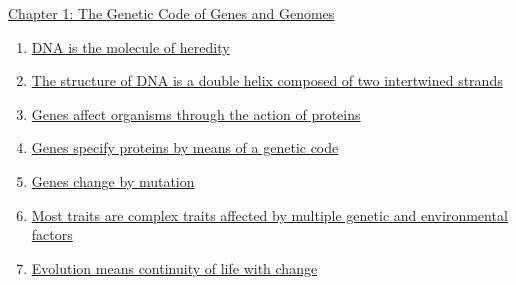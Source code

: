 \documentclass[12pt,letterpaper]{article}
\newcommand{\thetitle}{\hypertarget{home}{Essential Genetics and Genomics}}
\begin{document}



\clearpage

\renewcommand{\thetitle}{\hypertarget{1}{The Genetic Code of Genes
and Genomes}}
\hypertarget{1}{} 

\begin{chapbox}{\hyperlink{home}{Chapter 1: The Genetic Code of Genes
    and Genomes}}
    \begin{enumerate}
        \item \hyperlink{1.1}{DNA is the molecule of heredity}
        \item \hyperlink{1.2}{The structure of DNA is a double helix composed of two intertwined strands}
        \item \hyperlink{1.3}{Genes affect organisms through the action of proteins}
        \item \hyperlink{1.4}{Genes specify proteins by means of a genetic code}
        \item \hyperlink{1.5}{Genes change by mutation}
        \item \hyperlink{1.6}{Most traits are complex traits affected by multiple genetic and environmental factors}
        \item \hyperlink{1.7}{Evolution means continuity of life with change}
    \end{enumerate}
\end{chapbox}
\end{document}
